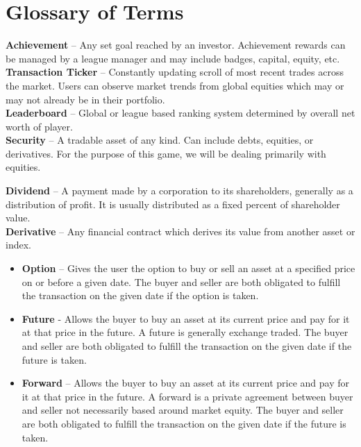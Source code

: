 \section{Glossary of Terms}

{
\setlength{\parindent}{0cm}
\textbf{Achievement} -- Any set goal reached by an investor.
Achievement rewards can be managed by a league manager and
may include badges, capital, equity, etc.\\

\textbf{Transaction Ticker} -- Constantly updating scroll of
most recent trades across the market. Users can observe market
trends from global equities which may or may not already be
in their portfolio.\\

\textbf{Leaderboard} -- Global or league based ranking system
determined by overall net worth of player.\\

\textbf{Security} -- A tradable asset of any kind. Can include
debts, equities, or derivatives. For the purpose of this game,
we will be dealing primarily with equities.\newline

\textbf{Dividend} -- A payment made by a corporation to its
shareholders, generally as a distribution of profit. It is
usually distributed as a fixed percent of shareholder value.\\

\textbf{Derivative} -- Any financial contract which derives its
value from another asset or index.\\

\begin{itemize}
    \item \textbf{Option} -- Gives the user the option to buy or sell an
asset at a specified price on or before a given date. The buyer
and seller are both obligated to fulfill the transaction on the
given date if the option is taken.\\

    \item \textbf{Future} - Allows the buyer to buy an asset at its current
price and pay for it at that price in the future. A future is
generally exchange traded. The buyer and seller are both obligated
to fulfill the transaction on the given date if the future is taken.\\

    \item \textbf{Forward} -- Allows the buyer to buy an asset at its current
price and pay for it at that price in the future. A forward is a
private agreement between buyer and seller not necessarily based around
market equity. The buyer and seller are both obligated to fulfill
the transaction on the given date if the future is taken.\\
\end{itemize}

}
